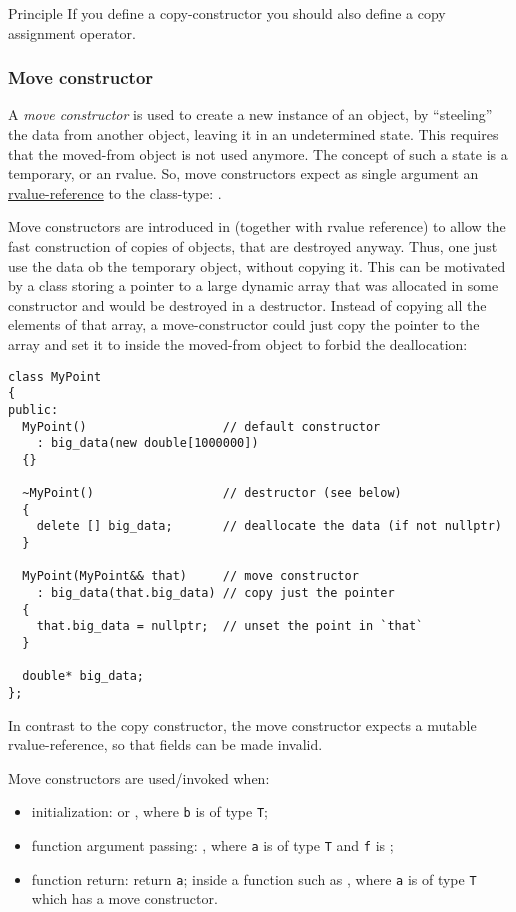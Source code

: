 \begin{guideline}{Principle}
  If you define a copy-constructor you should also define a copy assignment operator.
\end{guideline}


\subsubsection{Move constructor}
A \emph{move constructor}\marginpar{[\cxx{11}]} is used to create a new instance of an object, by ``steeling'' the data from another object,
leaving it in an undetermined state. This requires that the moved-from object is not used anymore. The concept of such a state is a temporary, or
an rvalue. So, move constructors expect as single argument an \underline{rvalue-reference} to the class-type: .

Move constructors are introduced in  (together with rvalue reference) to allow the fast construction of copies of objects, that are destroyed anyway.
Thus, one just use the data ob the temporary object, without copying it. This can be motivated by a class storing a pointer to a large dynamic array
that was allocated in some constructor and would be destroyed in a destructor. Instead of copying all the elements of that array, a move-constructor
could just copy the pointer to the array and set it to  inside the moved-from object to forbid the deallocation:
%
\begin{verbatim}
class MyPoint
{
public:
  MyPoint()                   // default constructor
    : big_data(new double[1000000])
  {}

  ~MyPoint()                  // destructor (see below)
  {
    delete [] big_data;       // deallocate the data (if not nullptr)
  }

  MyPoint(MyPoint&& that)     // move constructor
    : big_data(that.big_data) // copy just the pointer
  {
    that.big_data = nullptr;  // unset the point in `that`
  }

  double* big_data;
};
\end{verbatim}
%
In contrast to the copy constructor, the move constructor expects a mutable rvalue-reference, so that fields can be made invalid.

Move constructors are used/invoked when:
\begin{itemize}
  \item initialization:  or , where \texttt{b} is of type \texttt{T};
  \item function argument passing: , where \texttt{a} is of type \texttt{T} and \texttt{f} is ;
  \item function return: return \texttt{a}; inside a function such as , where \texttt{a} is of type \texttt{T} which has a move constructor.
\end{itemize}

